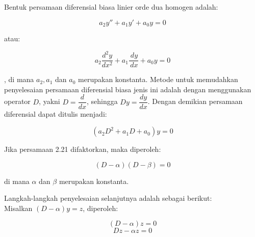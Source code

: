 Bentuk persamaan diferensial biasa linier orde dua homogen adalah:

\begin{equation} a_2 y'' + a_1 y' + a_0 y = 0 \end{equation}

atau:

\begin{displaymath} a_2 \dfrac{d^{2}y}{dx^{2}} + a_1 \dfrac{\, dy}{\, dx} + a_0 y = 0 \end{displaymath}

, di mana \begin{math} a_2, a_1 \end{math} dan \begin{math} a_0 \end{math} merupakan konstanta. Metode untuk memudahkan penyelesaian persamaan diferensial biasa jenis ini adalah dengan menggunakan operator \begin{math} D \end{math}, yakni \begin{math} D = \dfrac{d}{dx} \end{math}, sehingga \begin{math} Dy = \dfrac{dy}{dx} \end{math}. Dengan demikian persamaan diferensial dapat ditulis menjadi:

\begin{equation} (a_2 D^{2} + a_1 D + a_0)y = 0 \end{equation}

Jika persamaan 2.21 difaktorkan, maka diperoleh:

\begin{displaymath} (D - \alpha)(D - \beta) = 0 \end{displaymath}

di mana \begin{math} \alpha \end{math} dan \begin{math} \beta \end{math} merupakan konstanta.

Langkah-langkah penyelesaian selanjutnya adalah sebagai berikut: \\

Misalkan \begin{math} (D - \alpha)y = z \end{math}, diperoleh: 

\begin{displaymath} (D- \alpha)z = 0 \end{displaymath}
\begin{displaymath} Dz - \alpha z = 0 \end{displaymath}

